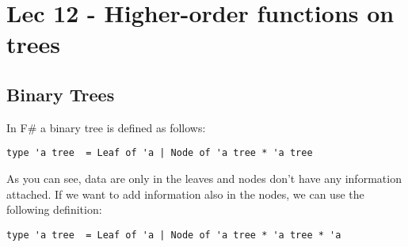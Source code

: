 \chapter{Lec 12 - Higher-order functions on trees}

\section{Binary Trees}
In F\# a binary tree is defined as follows:
\begin{lstlisting}[style = FSharpStyle]
    type 'a tree  = Leaf of 'a | Node of 'a tree * 'a tree
\end{lstlisting}
As you can see, data are only in the leaves and nodes don't have any information attached.\newline\newline
If we want to add information also in the nodes, we can use the following definition:
\begin{lstlisting}[style = FSharpStyle]
    type 'a tree  = Leaf of 'a | Node of 'a tree * 'a tree * 'a
\end{lstlisting}
